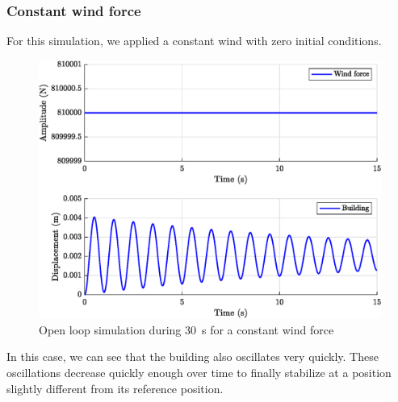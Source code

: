 \subsubsection{Constant wind force}
For this simulation, we applied a constant wind with zero initial conditions.
\begin{figure}[H]
    \centering
    \includegraphics[width=\textwidth]{resources/eps/constant-wind.eps}
    \caption{Open loop simulation during \SI{30}{\second} for a constant wind force}
\end{figure}
In this case, we can see that the building also oscillates very quickly. These oscillations decrease quickly enough over time to finally stabilize at a position slightly different from its reference position.

